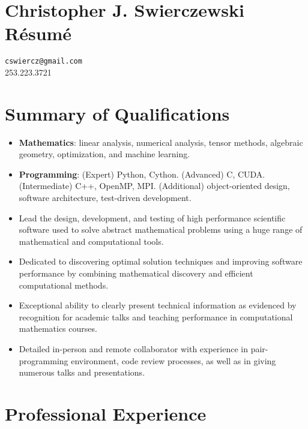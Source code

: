 \documentclass{article}
\begin{document}
\section*{Christopher J. Swierczewski \hspace{5.9cm} R\'esum\'e}

{\tt cswiercz@gmail.com} \\
253.223.3721

\section*{Summary of Qualifications}

\begin{itemize}
  \setlength{\itemsep}{0pt}
\item {\bf Mathematics}: linear analysis, numerical analysis, tensor methods,
  algebraic geometry, optimization, and machine learning.
\item {\bf Programming}: (Expert) Python, Cython. (Advanced) C, CUDA.
  (Intermediate) C++, OpenMP, MPI. (Additional) object-oriented design, software
  architecture, test-driven development.
\item Lead the design, development, and testing of high performance scientific
  software used to solve abstract mathematical problems using a huge range of
  mathematical and computational tools.
\item Dedicated to discovering optimal solution techniques and improving
  software performance by combining mathematical discovery and efficient
  computational methods.
\item Exceptional ability to clearly present technical information as evidenced
  by recognition for academic talks and teaching performance in computational
  mathematics courses.
\item Detailed in-person and remote collaborator with experience in
  pair-programming environment, code review processes, as well as in giving
  numerous talks and presentations.
\end{itemize}


\section*{Professional Experience}
\end{document}
